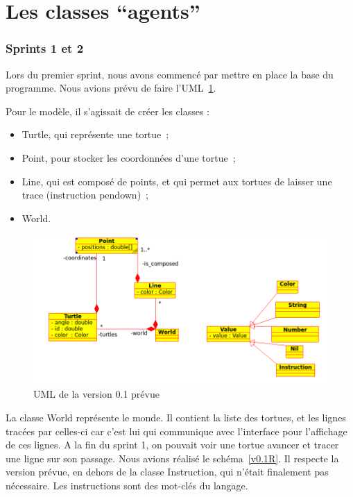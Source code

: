 \section{Les classes \enquote{agents}}
\subsubsection{Sprints 1 et 2}
Lors du premier sprint, nous avons commencé par mettre en place la base du programme. Nous avions prévu de faire l'UML~\ref{v0.1}.

 Pour le modèle, il s'agissait de créer les classes :
\begin{itemize}
\item Turtle, qui représente une tortue~;
\item Point, pour stocker les coordonnées d'une tortue~;
\item Line, qui est composé de points, et qui permet aux tortues de laisser une trace (instruction pendown)~;
\item World.
\end{itemize}


\begin{figure}[h]
\includegraphics[scale=0.5]{doc/report/uml/v01.png}
\caption{\label{v0.1} UML de la version 0.1 prévue}
\end{figure}


La classe World représente le monde. Il contient la liste des tortues, et les lignes tracées par celles-ci car c'est lui qui communique avec l'interface pour l'affichage de ces lignes.
A la fin du sprint 1, on pouvait voir une tortue avancer et tracer une ligne sur son passage.
Nous avions réalisé le schéma~\ref{v0.1R}. Il respecte la version prévue, en dehors de la classe Instruction, qui n'était finalement pas nécessaire. Les instructions sont des mot-clés du langage.\\

